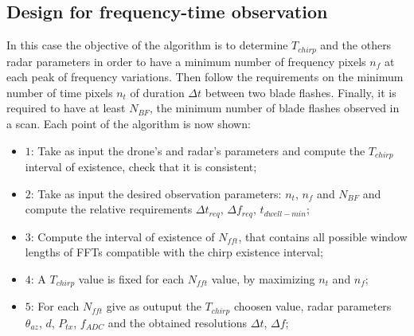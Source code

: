 \subsection{Design for frequency-time observation}
In this case the objective of the algorithm is to determine $T_{chirp}$ and the others radar parameters in order to have a minimum number of frequency pixels $n_{f}$ at each peak of frequency variations. Then follow the requirements on the minimum number of time pixels $n_{t}$ of duration $\Delta t$ between two blade flashes. Finally, it is required to have at least $N_{BF}$, the minimum number of blade flashes observed in a scan. Each point of the algorithm is now shown:

\begin{itemize}
    \item $1$: Take as input the drone's and radar's parameters and compute the $T_{chirp}$ interval of existence, check that it is consistent;
    
    \item $2$: Take as input the desired observation parameters: $n_{t}$, $n_{f}$ and $N_{BF}$ and compute the relative requirements $\Delta t_{req}$,  $\Delta f_{req}$, $t_{dwell-min}$;
         
    \item $3$: Compute the interval of existence of $N_{fft}$, that contains all possible window lengths of FFTs compatible with the chirp existence interval;

    \item $4$: A $T_{chirp}$ value is fixed for each $N_{fft}$ value, by maximizing $n_{t}$ and $n_{f}$;
    
    \item $5$: For each $N_{fft}$ give as outuput the $T_{chirp}$ choosen value, radar parameters $\theta_{az}$, $d$, $P_{tx}$, $f_{ADC}$ and the obtained resolutions $\Delta t$, $\Delta f$;
    
\end{itemize}

